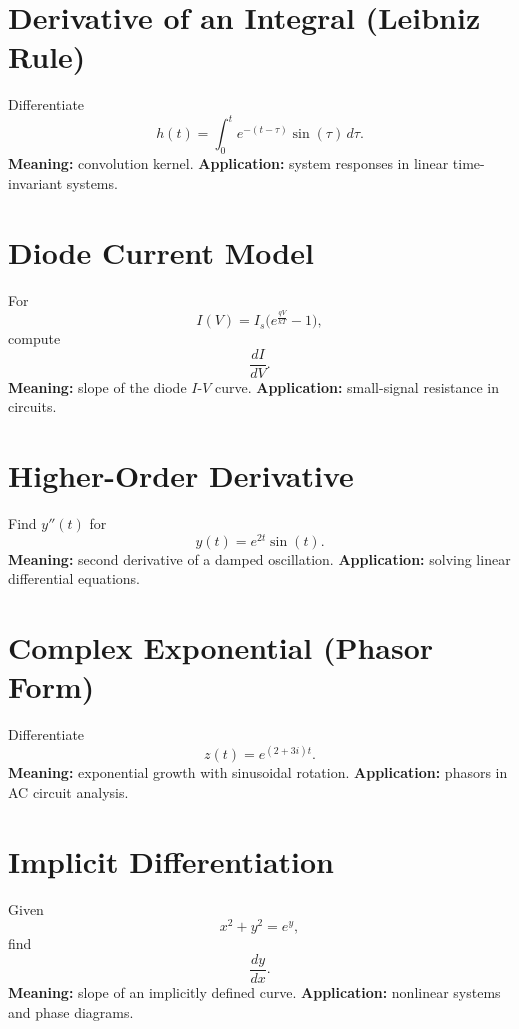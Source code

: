 \documentclass[11pt,a4paper]{article}
\begin{document}
	\section{Derivative of an Integral (Leibniz Rule)}
	Differentiate
	$$
	h(t) = \int_0^t e^{-(t-\tau)}\sin(\tau)\,d\tau.
	$$
	\textbf{Meaning:} convolution kernel.  
	\textbf{Application:} system responses in linear time-invariant systems.
	
	\section{Diode Current Model}
	For
	$$
	I(V) = I_s\Big(e^{\tfrac{qV}{kT}} - 1\Big),
	$$
	compute
	$$
	\frac{dI}{dV}.
	$$
	\textbf{Meaning:} slope of the diode $I$-$V$ curve.  
	\textbf{Application:} small-signal resistance in circuits.
	
	\section{Higher-Order Derivative}
	Find $y''(t)$ for
	$$
	y(t) = e^{2t}\sin(t).
	$$
	\textbf{Meaning:} second derivative of a damped oscillation.  
	\textbf{Application:} solving linear differential equations.
	
	\section{Complex Exponential (Phasor Form)}
	Differentiate
	$$
	z(t) = e^{(2+3i)t}.
	$$
	\textbf{Meaning:} exponential growth with sinusoidal rotation.  
	\textbf{Application:} phasors in AC circuit analysis.
	
	\section{Implicit Differentiation}
	Given
	$$
	x^2 + y^2 = e^y,
	$$
	find
	$$
	\frac{dy}{dx}.
	$$
	\textbf{Meaning:} slope of an implicitly defined curve.  
	\textbf{Application:} nonlinear systems and phase diagrams.
	
\end{document}
